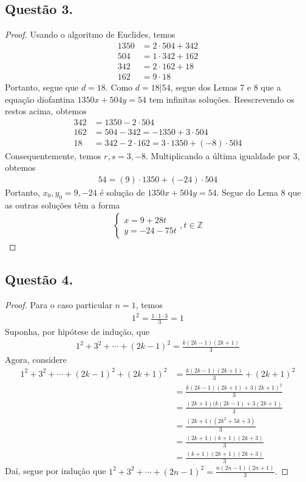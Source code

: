 \documentclass[a4paper,12pt]{article}
\theoremstyle{definition}
\begin{document}
\subsection*{Questão 3.}
\begin{proof}
	Usando o algoritmo de Euclides, temos
	\begin{align*}
	1350 &= 2\cdot 504 + 342 \\
	504 &= 1\cdot 342 + 162 \\
	342 &= 2\cdot 162 + 18 \\
	162 &= 9\cdot 18
	\end{align*}
	Portanto, segue que $d = 18$. Como $d=18|54$, segue dos Lemas 7 e 8 que a equação diofantina $1350x + 504y = 54$ tem infinitas soluções. Reescrevendo os restos acima, obtemos
	\begin{align*}
	342 &= 1350 - 2\cdot 504 \\
	162 &= 504 - 342 = -1350 + 3\cdot 504 \\
	18 &= 342 - 2\cdot 162 = 3\cdot 1350 + (-8)\cdot 504
	\end{align*}
	Consequentemente, temos $r,s = 3, -8$. Multiplicando a última igualdade por $3$, obtemos
	\begin{align*}
	54 = (9)\cdot 1350 + (-24)\cdot 504
	\end{align*}
	Portanto, $x_0, y_0 = 9, -24$ é solução de $1350x + 504y = 54$. Segue do Lema 8 que as outras soluções têm a forma
	\begin{align*}
	\begin{cases}
	x = 9 + 28t \\
	y = -24 - 75t
	\end{cases}, t\in\mathbb{Z}
	\end{align*}
\end{proof}
	
\subsection*{Questão 4.}
\begin{proof}
	Para o caso particular $n=1$, temos
	\begin{align*}
	1^2 = \frac{1\cdot 1\cdot 3}{3} = 1
	\end{align*}
	Suponha, por hipótese de indução, que 
	\begin{align*}
	1^2 + 3^2 + \cdots + (2k-1)^2 = \frac{k(2k-1)(2k+1)}{3}
	\end{align*}
	Agora, considere
	\begin{align*} 
	1^2 + 3^2 + \cdots + (2k-1)^2 + (2k+1)^2 &= \frac{k(2k-1)(2k+1)}{3} + (2k+1)^2 \\
	&= \frac{k(2k-1)(2k+1) + 3(2k+1)^2}{3} \\
	&= \frac{(2k+1)(k(2k-1) + 3(2k+1)}{3} \\
	&= \frac{(2k+1)(2k^2 + 5k + 3)}{3} \\
	&= \frac{(2k+1)(k+1)(2k + 3)}{3} \\
	&= \frac{(k+1)(2k+1)(2k+3)}{3}
	\end{align*}
	Daí, segue por indução que $1^2 + 3^2 + \cdots + (2n-1)^2 = \displaystyle{ \frac{n(2n-1)(2n+1)}{3} }.$
\end{proof}
	
	
	
	
	
	
	
	
	
	
	
	
	
	
\end{document}
